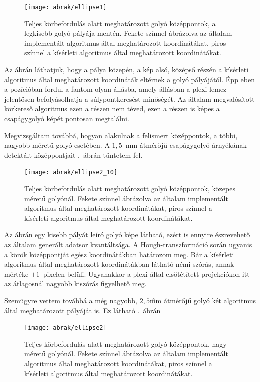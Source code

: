 \documentclass[a4paper,12pt]{article}
\begin{document}
\begin{figure}[htbp]
\center
\texttt{[image: abrak/ellipse1]}
\caption{Teljes körbefordulás alatt meghatározott golyó középpontok, a legkisebb golyó pályája  mentén. Fekete színnel ábrázolva az általam implementált algoritmus által meghatározott koordinátákat, piros színnel a kísérleti algoritmus által meghatározott koordinátákat.}
\label{fig:ellipseskicsi}
\end{figure}


 Az ábrán láthatjuk, hogy a pálya közepén, a kép alsó, középső részén a kísérleti algoritmus által meghatározott koordináták eltérnek a golyó pályájától. Épp eben a pozícióban fordul a fantom olyan állásba, amely állásban a plexi lemez jelentősen befolyásolhatja a súlypontkeresést minőségét. Az általam megvalósított körkereső algoritmus ezen a részen nem téved, ezen a részen is képes a csapágygolyó képét pontosan megtalálni.
 
 
 Megvizsgáltam továbbá, hogyan alakulnak a felismert középpontok, a többi, nagyobb méretű golyó esetében. A $1,\!5$~mm átmérőjű csapágygolyó árnyékának detektált középpontjait .~ábrán tüntetem fel. 




\begin{figure}[htbp]
\center
\texttt{[image: abrak/ellipse2\_10]}
\caption{Teljes körbefordulás alatt meghatározott golyó középpontok, közepes méretű golyónál. Fekete színnel ábrázolva az általam implementált algoritmus által meghatározott koordinátákat, piros színnel a kísérleti algoritmus által meghatározott koordinátákat.}
\label{fig:ellipses2_10}
\end{figure}




Az ábrán egy kisebb pályát leíró golyó képe látható, ezért is ennyire észrevehető az általam generált adatsor kvantáltsága. A Hough-transzformáció során ugyanis a körök középpontját egész koordinátákban határozom meg. Bár a kísérleti algoritmus által meghatározott koordinátákban látható némi szórás, annak mértéke $\pm 1$~pixelen belüli. Ugyanakkor a plexi által elsötétített projekciókon itt az átlagosnál nagyobb kiszórás figyelhető meg.


Szemügyre vettem továbbá a  még nagyobb, $2,\!5$\~mm átmérőjű golyó két algoritmus által meghatározott pályáját is. Ez látható  .~ábrán




\begin{figure}[htbp]
\center
\texttt{[image: abrak/ellipse2]}
\caption{Teljes körbefordulás alatt meghatározott golyó középpontok, nagy méretű golyónál. Fekete színnel ábrázolva az általam implementált algoritmus által meghatározott koordinátákat, piros színnel a kísérleti algoritmus által meghatározott koordinátákat.}
\label{fig:ellipses2}
\end{figure}
\end{document}
